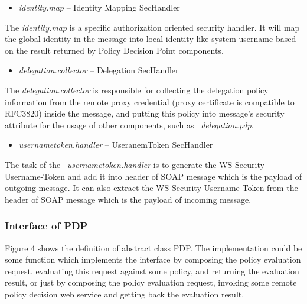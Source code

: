 \documentclass{article}
\newcommand\liststyleWWviiiNumxiii{%
\renewcommand\labelitemi{[F0B7?]}
\renewcommand\labelitemii{[F0B7?]}
\renewcommand\labelitemiii{[F0B7?]}
\renewcommand\labelitemiv{[F0B7?]}
}
\newcounter{Figure}
\begin{document}
\liststyleWWviiiNumxiii
\begin{itemize}
\item {\color{black}
\textit{identity.map} -- Identity Mapping SecHandler}
\end{itemize}
{\upshape\color{black}
The \textit{identity.map} is a specific authorization oriented security
handler. It will map the global identity in the message into local
identity like system username based on the result returned by Policy
Decision Point components.}

\liststyleWWviiiNumxiii
\begin{itemize}
\item {\color{black}
\textit{delegation.collector} -- Delegation SecHandler}
\end{itemize}
{\upshape\color{black}
The \textit{delegation.collector} is responsible for collecting the
delegation policy information from the remote proxy credential (proxy
certificate is compatible to RFC3820) inside the message, and putting
this policy into message{\textquoteright}s security attribute for the
usage of other components, such as \ \textit{delegation.pdp}.}

\liststyleWWviiiNumxiii
\begin{itemize}
\item {\color{black}
\textit{usernametoken.handler} -- UseranemToken SecHandler}
\end{itemize}
{\upshape\color{black}
The task of the \ \textit{usernametoken.handler} is to generate the
WS-Security Username-Token and add it into header of SOAP message which
is the payload of outgoing message. It can also extract the WS-Security
Username-Token from the header of SOAP message which is the payload of
incoming message.}

\subsubsection[Interface of PDP]{Interface of PDP}
\label{bkm:Ref204009855}{\upshape\color{black}
Figure 4 shows the definition of abstract class PDP. The implementation
could be some function which implements the interface by composing the
policy evaluation request, evaluating this request against some policy,
and returning the evaluation result, or just by composing the policy
evaluation request, invoking some remote policy decision web service
and getting back the evaluation result.}
\end{document}

